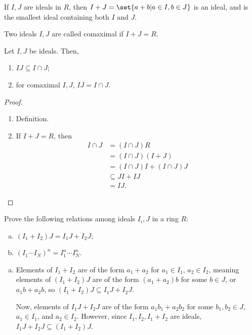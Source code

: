 \documentclass[10pt]{mypackage}
\begin{document}
If $I,J$ are ideals in $R$, then $I+J = \set{a + b | a\in I,b\in J}$ is an ideal, and is the smallest ideal containing both $I$ and $J$.\newline

Two ideals $I,J$ are called comaximal if $I + J = R$.
\begin{lemma}
  Let $I,J$ be ideals. Then,
  \begin{enumerate}[(1)]
    \item $IJ\subseteq I\cap J$;
    \item for comaximal $I,J$, $IJ = I\cap J$.
  \end{enumerate}
\end{lemma}
\begin{proof}\hfill
  \begin{enumerate}[(1)]
    \item Definition.
    \item If $I + J = R$, then
      \begin{align*}
        I\cap J &= \left( I\cap J \right) R\\
                &= \left( I\cap J \right)\left(  I + J \right)\\
                &= \left( I\cap J \right)I + \left( I\cap J \right)J\\
                &\subseteq JI + IJ\\
                &= IJ.
      \end{align*}
  \end{enumerate}
\end{proof}
\begin{exercise}[Exercise 2.39]
  Prove the following relations among ideals $I_i,J$ in a ring $R$:
  \begin{enumerate}[(a)]
    \item $\left( I_1 + I_2 \right)J = I_1J + I_2 J$;
    \item $\left( I_1\cdots I_N \right)^{n} = I_1^{n}\cdots I_N^{n}$.
  \end{enumerate}
\end{exercise}
\begin{solution}\hfill
  \begin{enumerate}[(a)]
    \item Elements of $I_1 + I_2$ are of the form $a_1 + a_2$ for $a_1\in I_1$, $a_2\in I_2$, meaning elements of $\left( I_1 + I_2 \right)J$ are of the form $\left( a_1 + a_2 \right)b$ for some $b\in J$, or $a_1b + a_2b$, so $\left( I_1 + I_2 \right)J \subseteq I_1J + I_2J$.\newline

      Now, elements of $I_1J + I_2J$ are of the form $a_1b_1 + a_2b_2$ for some $b_1,b_2\in J$, $a_1\in I_1$, and $a_2\in I_2$. However, since $I_1 , I_2,I_1 + I_2$ are ideals, $I_1J + I_2J\subseteq \left( I_1 + I_2 \right)J$.
  \end{enumerate}
\end{solution}
\end{document}
